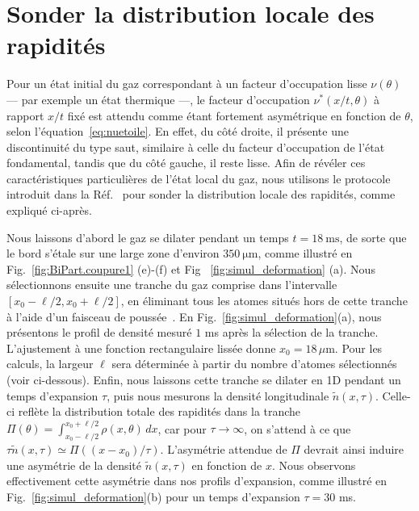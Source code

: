 \section{Sonder la distribution locale des rapidités}
\label{sec:local}

Pour un état initial du gaz correspondant à un facteur d'occupation lisse $\nu(\theta)$ — par exemple un état thermique —, le facteur d'occupation $\nu^*(x/t,\theta)$ à rapport $x/t$ fixé est attendu comme étant fortement asymétrique en fonction de $\theta$, selon l'équation~\eqref{eq:nuetoile}. En effet, du côté droite, il présente une discontinuité du type saut, similaire à celle du facteur d'occupation de l’état fondamental, tandis que du côté gauche, il reste lisse. Afin de révéler ces caractéristiques particulières de l’état local du gaz, nous utilisons le protocole introduit dans la Réf.~\cite{dubois_probing_2024} pour sonder la distribution locale des rapidités, comme expliqué ci-après.

Nous laissons d’abord le gaz se dilater pendant un temps $t=18~\mathrm{ms}$, de sorte que le bord s’étale sur une large zone d’environ $350~\mathrm{\mu m}$, comme illustré en Fig.~\ref{fig:BiPart.coupure1} (e)-(f) et  Fig ~\ref{fig:simul_deformation} (a).  
Nous sélectionnons ensuite une tranche du gaz comprise dans l’intervalle $[x_0-\ell/2, x_0+\ell/2]$, en éliminant tous les atomes situés hors de cette tranche à l’aide d’un faisceau de poussée~\cite{dubois_probing_2024}.  
En Fig.~\ref{fig:simul_deformation}(a), nous présentons le profil de densité mesuré $1$ ms après la sélection de la tranche.  
L’ajustement à une fonction rectangulaire lissée donne $x_0 = 18\,\mu$m.  
Pour les calculs, la largeur $\ell$ sera déterminée à partir du nombre d’atomes sélectionnés (voir ci-dessous).  
Enfin, nous laissons cette tranche se dilater en 1D pendant un temps d’expansion $\tau$, puis nous mesurons la densité longitudinale $\tilde{n}(x,\tau)$.  
Celle-ci reflète la distribution totale des rapidités dans la tranche $\Pi(\theta) = \int_{x_0 - \ell/2}^{x_0 + \ell/2} \rho(x, \theta)\, dx$, car pour $\tau \rightarrow \infty$, on s’attend à ce que $\tau \tilde{n}(x,\tau) \simeq \Pi((x-x_0)/\tau)$.  
L’asymétrie attendue de $\Pi$ devrait ainsi induire une asymétrie de la densité $\tilde{n}(x,\tau)$ en fonction de $x$.  
Nous observons effectivement cette asymétrie dans nos profils d’expansion, comme illustré en Fig.~\ref{fig:simul_deformation}(b) pour un temps d’expansion $\tau=30$ ms.

